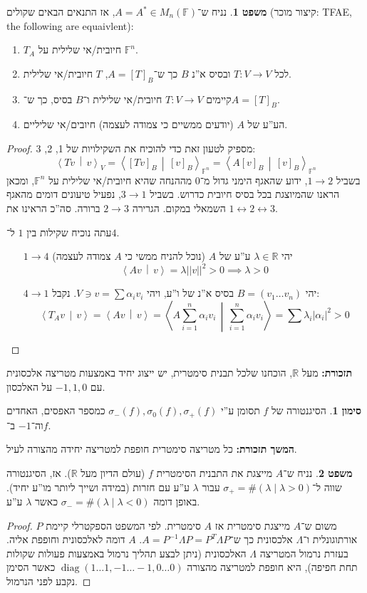 \documentclass[a4paper]{article}
\newcommand\R     {\mathbb{R}}
\newcommand\ra    {\rangle}
\newcommand\la    {\langle}
\newcommand\sumnio    {\sum_{i = 1}^{n}}
\DeclareMathOperator{\diag}    {diag}
\newcommand\lra       {\leftrightarrow}
\newcommand\F         {\mathbb{F}}
\newcommand\co        {\colon}
\newcommand\norm[1]   {\left \vert \left \vert #1 \right \vert \right \vert}
\newcommand\mut [2]   {\left \la #1 \,\middle|\, #2 \right \ra}
\newcommand\ag        {\alpha}
\renewcommand\lg      {\lambda}
\newcommand\sg        {\sigma}
\newcommand\Lg        {\Lambda}
\newcommand\op    {^{-1}}
\theoremstyle{definition}
\newtheorem{Theorem}{\color{myblue}משפט}
\newtheorem{Notion}{\color{myred}סימון}
\newcommand\theo  [1] {\begin{Theorem}#1\end{Theorem}}
\newcommand\noti  [1] {\begin{Notion}#1\end{Notion}}
\begin{document}
	\theo{נניח ש־$A = A^* \in M_n(\F)$, אז התנאים הבאים שקולים (קיצור מוכר: TFAE, the following are equaivlent): 
		\begin{enumerate}
			\item $T_A$ חיובית/אי שלילית על $\F^n$. 
			\item לכל $T \co V \to V$ ובסיס א''נ $B$ כך ש־$A = [T]_B$, $T$ חיובית/אי שלילית. 
			\item קיימים $T \co V \to V$ חיובית/אי שלילית ו־$B$ בסיס, כך ש־$A = [T]_B$. 
			\item הע''ע של $A$ (יודעים ממשיים כי צמודה לעצמה) חיובים/אי שליליים. 
	\end{enumerate}}
	\begin{proof}
		מספיק לטעון זאת כדי להוכיח את השקילויות של 1, 2, 3: 
		\[ \mut{Tv}{v}_V = \mut{[Tv]_B}{[v]_B}_{\F^n} = \mut{A[v]_B}{[v]_B}_{\F^n} \]
		בשביל $1 \to 2$, ידוע שהאגף הימני גדול מ־$0$ מההנחה שהיא חיובית/אי שלילית על $\F^n$, ומכאן הראנו שהמיוצגת בכל בסיס חיובית כדרוש. בשביל $3 \to 1$, נפעיל טיעונים דומים מהאגף השמאלי במקום. הגרירה $2 \to 3$ ברורה. סה''כ הראינו את $1\lra2\lra 3$. 
		
		עתה נוכיח שקילות בין $1$ ל־$4$. 
		\begin{itemize}
			\item[$1 \to 4$] יהי $\lg \in \R$ ע''ע של $A$ (נוכל להניח ממשי כי $A$ צמודה לעצמה)
			\[ \mut{Av}{v} = \lg\norm{v}^2 > 0 \implies \lg > 0 \]
			\item[$4 \to 1$] יהי $B = (v_1 \dots v_n)$ בסיס א''נ של ו''ע, ויהי $V \ni v = \sum \ag_i v_i$. נקבל: 
			\[ \mut{T_Av}{v} = \mut{Av}{v} = \mut{A\sumnio \ag_i v_i}{\sumnio \ag_i v_i} = \sum \lg_i |\ag_i|^2 > 0 \]
		\end{itemize}
	\end{proof}
	
	\textbf{תזכורת: }מעל $\R$, הוכחנו שלכל תבנית סימטרית, יש ייצוג יחיד באמצעות מטריצה אלכסונית עם $-1, 1, 0$ על האלכסון. 
	\noti{הסיגנטורה של $f$ תסומן ע''י $\sg_-(f), \sg_0(f), \sg_+(f)$ כמספר האפסים, האחדים וה־$-1$ ב־$f$. }
	
	\textbf{המשך תזכורת: }כל מטריצה סימטרית חופפת למטריצה יחידה מהצורה לעיל. 
	
	\theo{נניח ש־$A$ מייצגת את התבנית הסימטרית $f$ (עולם הדיון מעל $\R$). אז, הסיגנטורה שווה ל־$\sg_+ = \#(\lg \mid \lg > 0)$ עבור $\lg$ ע''ע עם חזרות (במידה ושייך ליותר מו''ע יחיד). באופן דומה $\sg_- = \#(\lg \mid \lg < 0)$ כאשר $\lg$ ע''ע. }
	
	\begin{proof}
		משום ש־$A$ מייצגת סימטרית אז $A$ סימטרית. לפי המשפט הספקטרלי קיימת $P$ אורתוגונלית ו־$\Lg$ אלכסונית כך ש־$A = P\op\Lg P = P^T\Lg P$. $A$ דומה לאלכסונית וחופפת אליה. בעזרת נרמול המטריצה $\Lg$ האלכסונית (ניתן לבצע תהליך נרמול באמצעות פעולות שקולות תחת חפיפה), היא חופפת למטריצה מהצורה $\diag(1 \dots 1, -1 \ldots -1, 0 \ldots 0)$ כאשר הסימן נקבע לפני הנרמול. 
	\end{proof}
	
\end{document}
